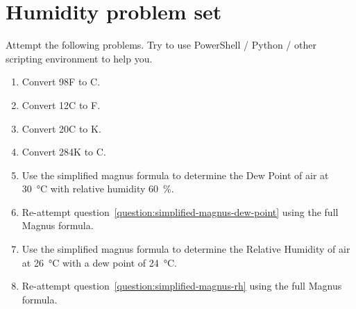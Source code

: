 \chapter{Humidity problem set}

Attempt the following problems.
Try to use PowerShell / Python / other scripting environment to help you. 

\begin{enumerate}

\item
  Convert 98F to C.

\item
  Convert 12C to F.

\item
  Convert 20C to K.

\item
  Convert 284K to C.
  
\item
  \label{question:simplified-magnus-dew-point}
  Use the simplified magnus formula to determine the Dew Point of air at \SI{30}{\celsius} with relative humidity \SI{60}{\percent}.

\item
  Re-attempt question~\ref{question:simplified-magnus-dew-point} using the full Magnus formula.
  
\item
  \label{question:simplified-magnus-rh}  
  Use the simplified magnus formula to determine the Relative Humidity of air at \SI{26}{\celsius} with a dew point of \SI{24}{\celsius}. 

\item
  Re-attempt question~\ref{question:simplified-magnus-rh} using the full Magnus formula.

  
\end{enumerate}



